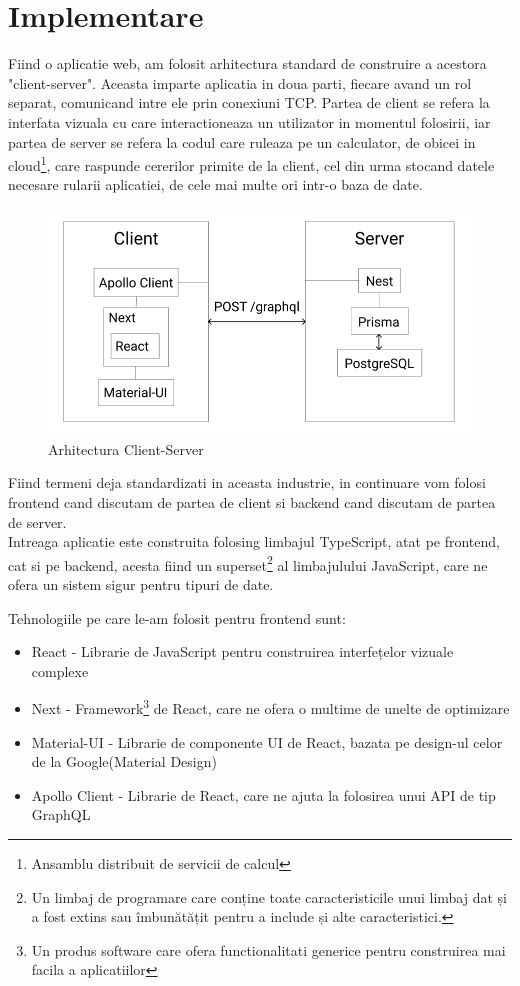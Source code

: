 \documentclass[12pt, a4paper, oneside, romanian]{teza-upb}
\begin{document}
\chapter{Implementare}

Fiind o aplicatie web, am folosit arhitectura standard de construire a acestora "client-server". Aceasta imparte aplicatia in doua parti, fiecare avand un rol separat, comunicand intre ele prin conexiuni TCP. Partea de client se refera la interfata vizuala cu care interactioneaza un utilizator in momentul folosirii, iar partea de server se refera la codul care ruleaza pe un calculator, de obicei in cloud\footnote{Ansamblu distribuit de servicii de calcul}, care raspunde cererilor primite de la client, cel din urma stocand datele necesare rularii aplicatiei, de cele mai multe ori intr-o baza de date.

\begin{figure}[H]
\centering
\includegraphics*[width=0.7\columnwidth]{arhitectura-client-server}
\caption{Arhitectura Client-Server}
\label{arhitectura-client-server}
\end{figure}

Fiind termeni deja standardizati in aceasta industrie, in continuare vom folosi frontend cand discutam de partea de client si backend cand discutam de partea de server. \\

Intreaga aplicatie este construita folosing limbajul TypeScript, atat pe frontend, cat si pe backend, acesta fiind un superset\footnote{Un limbaj de programare care conține toate caracteristicile unui limbaj dat și a fost extins sau îmbunătățit pentru a include și alte caracteristici.} al limbajulului JavaScript, care ne ofera un sistem sigur pentru tipuri de date.

Tehnologiile pe care le-am folosit pentru frontend sunt:
\begin{itemize}
	\item React - Librarie de JavaScript pentru construirea interfețelor vizuale complexe
	\item Next - Framework\footnote{Un produs software care ofera functionalitati generice pentru construirea mai facila a aplicatiilor} de React, care ne ofera o multime de unelte de optimizare
	\item Material-UI - Librarie de componente UI de React, bazata pe design-ul celor de la Google(Material Design)
	\item Apollo Client - Librarie de React, care ne ajuta la folosirea unui API de tip GraphQL
\end{itemize}
\end{document}
